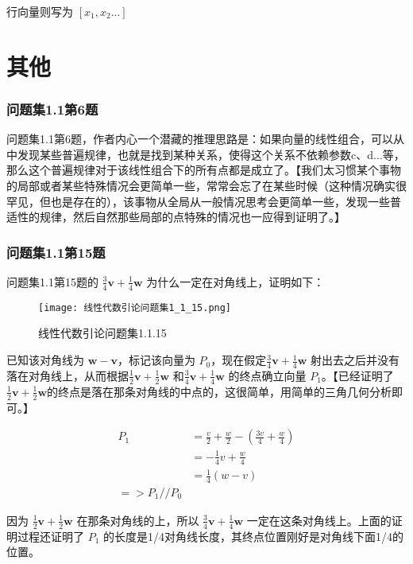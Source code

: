 \documentclass[12pt,oneside]{book}
\begin{document}
行向量则写为 $[x_1, x_2...]$


\chapter{其他}

\subsection{问题集1.1第6题}
\cite{线性代数引论}问题集1.1第6题，作者内心一个潜藏的推理思路是：如果向量的线性组合，可以从中发现某些普遍规律，也就是找到某种关系，使得这个关系不依赖参数c、d...等，那么这个普遍规律对于该线性组合下的所有点都是成立了。【我们太习惯某个事物的局部或者某些特殊情况会更简单一些，常常会忘了在某些时候（这种情况确实很罕见，但也是存在的），该事物从全局从一般情况思考会更简单一些，发现一些普适性的规律，然后自然那些局部的点特殊的情况也一应得到证明了。】

\subsection{问题集1.1第15题}
\cite{线性代数引论}问题集1.1第15题的 $\frac{3}{4}\boldsymbol{v} + \frac{1}{4}\boldsymbol{w}$ 为什么一定在对角线上，证明如下：

\begin{figure}[H]
\centering
\texttt{[image: 线性代数引论问题集1\_1\_15.png]}
\caption{线性代数引论问题集1.1.15}
\end{figure}

已知该对角线为 $\boldsymbol{w} - \boldsymbol{v}$，标记该向量为 $P_0$，现在假定$\frac{3}{4}\boldsymbol{v} + \frac{1}{4}\boldsymbol{w}$ 射出去之后并没有落在对角线上，从而根据$\frac{1}{2}\boldsymbol{v} + \frac{1}{2}\boldsymbol{w}$ 和$\frac{3}{4}\boldsymbol{v} + \frac{1}{4}\boldsymbol{w}$ 的终点确立向量 $P_1$。【已经证明了$\frac{1}{2}\boldsymbol{v} + \frac{1}{2}\boldsymbol{w}$的终点是落在那条对角线的中点的，这很简单，用简单的三角几何分析即可。】

\begin{align*}
P_1 &= \frac{v}{2} + \frac{w}{2} - (\frac{3v}{4} + \frac{w}{4}) \\
    &= -\frac{1}{4}v + \frac{w}{4} \\
    &= \frac{1}{4}(w-v) \\    
 => P_1 // P_0
\end{align*}

因为 $\frac{1}{2}\boldsymbol{v} + \frac{1}{2}\boldsymbol{w}$ 在那条对角线的上，所以 $\frac{3}{4}\boldsymbol{v} + \frac{1}{4}\boldsymbol{w}$ 一定在这条对角线上。上面的证明过程还证明了 $P_1$ 的长度是1/4对角线长度，其终点位置刚好是对角线下面1/4的位置。
\end{document}
